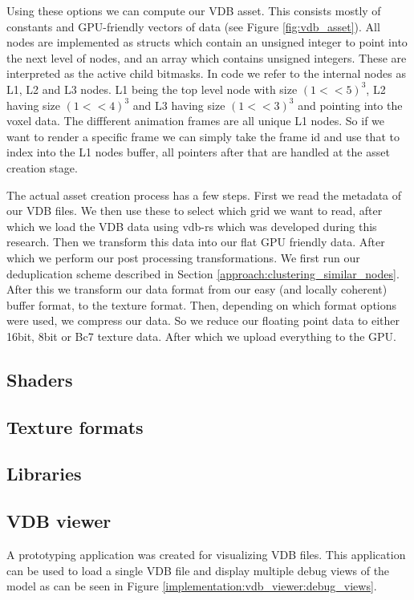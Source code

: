 Using these options we can compute our VDB asset. This consists mostly of constants and GPU-friendly vectors of data (see Figure \ref{fig:vdb_asset}). All nodes are implemented as structs which contain an unsigned integer to point into the next level of nodes, and an array which contains unsigned integers. These are interpreted as the active child bitmasks. In code we refer to the internal nodes as L1, L2 and L3 nodes. L1 being the top level node with size $(1 << 5)^3$, L2 having size $(1 << 4)^3$ and L3 having size $(1 << 3)^3$ and pointing into the voxel data. The diffferent animation frames are all unique L1 nodes. So if we want to render a specific frame we can simply take the frame id and use that to index into the L1 nodes buffer, all pointers after that are handled at the asset creation stage.

The actual asset creation process has a few steps. First we read the metadata of our VDB files. We then use these to select which grid we want to read, after which we load the VDB data using vdb-rs \cite{VDBRS} which was developed during this research. Then we transform this data into our flat GPU friendly data. After which we perform our post processing transformations. We first run our deduplication scheme described in Section \ref{approach:clustering_similar_nodes}. After this we transform our data format from our easy (and locally coherent) buffer format, to the texture format. Then, depending on which format options were used, we compress our data. So we reduce our floating point data to either 16bit, 8bit or Bc7 texture data. After which we upload everything to the GPU.


\subsection{Shaders} \label{implementation:shaders}
\subsection{Texture formats} \label{implementation:texture_formats}
\subsection{Libraries} \label{implementation:libraries}



\subsection{VDB viewer} \label{implementation:vdb_viewer}
A prototyping application was created for visualizing VDB files. This application can be used to load a single VDB file and display multiple debug views of the model as can be seen in Figure \ref{implementation:vdb_viewer:debug_views}.


